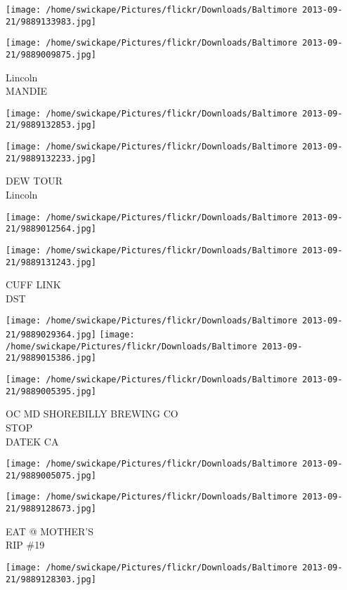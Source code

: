 \documentclass[10pt,letterpaper]{article}
\begin{document}
\texttt{[image: /home/swickape/Pictures/flickr/Downloads/Baltimore 2013-09-21/9889133983.jpg]}

\vspace{0.25in}
\texttt{[image: /home/swickape/Pictures/flickr/Downloads/Baltimore 2013-09-21/9889009875.jpg]}

Lincoln\\
MANDIE
\pagebreak

\texttt{[image: /home/swickape/Pictures/flickr/Downloads/Baltimore 2013-09-21/9889132853.jpg]}

\vspace{0.25in}
\texttt{[image: /home/swickape/Pictures/flickr/Downloads/Baltimore 2013-09-21/9889132233.jpg]}

DEW TOUR\\
Lincoln
\pagebreak

\texttt{[image: /home/swickape/Pictures/flickr/Downloads/Baltimore 2013-09-21/9889012564.jpg]}

\vspace{0.25in}
\texttt{[image: /home/swickape/Pictures/flickr/Downloads/Baltimore 2013-09-21/9889131243.jpg]}

CUFF LINK\\
DST
\pagebreak

\texttt{[image: /home/swickape/Pictures/flickr/Downloads/Baltimore 2013-09-21/9889029364.jpg]}
\texttt{[image: /home/swickape/Pictures/flickr/Downloads/Baltimore 2013-09-21/9889015386.jpg]}

\vspace{0.25in}
\texttt{[image: /home/swickape/Pictures/flickr/Downloads/Baltimore 2013-09-21/9889005395.jpg]}

OC MD SHOREBILLY BREWING CO\\
STOP\\
DATEK CA
\pagebreak

\texttt{[image: /home/swickape/Pictures/flickr/Downloads/Baltimore 2013-09-21/9889005075.jpg]}

\vspace{0.25in}
\texttt{[image: /home/swickape/Pictures/flickr/Downloads/Baltimore 2013-09-21/9889128673.jpg]}

EAT @ MOTHER'S\\
RIP \#19
\pagebreak

\texttt{[image: /home/swickape/Pictures/flickr/Downloads/Baltimore 2013-09-21/9889128303.jpg]}
\end{document}
